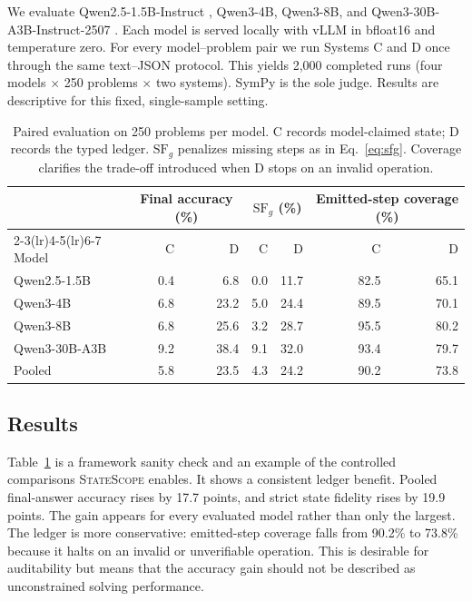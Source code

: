 \documentclass[11pt]{article}
\newcommand{\systemname}{\textsc{StateScope}}
\begin{document}
We evaluate Qwen2.5-1.5B-Instruct \citep{qwen2024qwen25}, Qwen3-4B, Qwen3-8B, and
Qwen3-30B-A3B-Instruct-2507 \citep{yang2025qwen3}.  Each model is served locally
with vLLM in bfloat16 and temperature zero.  For every model--problem pair we run
Systems C and D once through the same text--JSON protocol.  This yields 2,000
completed runs (four models $\times$ 250 problems $\times$ two systems).  SymPy is
the sole judge.  Results are descriptive for this fixed, single-sample setting.

\begin{table}[t]
\centering
\small
\begin{tabular}{lrrrrrr}
\toprule
& \multicolumn{2}{c}{Final accuracy (\%)}
& \multicolumn{2}{c}{$\mathrm{SF}_{g}$ (\%)}
& \multicolumn{2}{c}{Emitted-step coverage (\%)} \\
\cmidrule(lr){2-3}\cmidrule(lr){4-5}\cmidrule(lr){6-7}
Model & C & D & C & D & C & D \\
\midrule
Qwen2.5-1.5B          & 0.4 & 6.8  & 0.0 & 11.7 & 82.5 & 65.1 \\
Qwen3-4B              & 6.8 & 23.2 & 5.0 & 24.4 & 89.5 & 70.1 \\
Qwen3-8B              & 6.8 & 25.6 & 3.2 & 28.7 & 95.5 & 80.2 \\
Qwen3-30B-A3B         & 9.2 & 38.4 & 9.1 & 32.0 & 93.4 & 79.7 \\
\midrule
Pooled                 & 5.8 & 23.5 & 4.3 & 24.2 & 90.2 & 73.8 \\
\bottomrule
\end{tabular}
\caption{Paired evaluation on 250 problems per model.  C records model-claimed
state; D records the typed ledger.  $\mathrm{SF}_{g}$ penalizes missing steps as in
Eq.~\ref{eq:sfg}.  Coverage clarifies the trade-off introduced when D stops on an
invalid operation.}
\label{tab:main}
\end{table}

\subsection{Results}

Table~\ref{tab:main} is a framework sanity check and an example of the controlled
comparisons \systemname{} enables.  It shows a consistent ledger benefit.  Pooled final-answer
accuracy rises by 17.7 points, and strict state fidelity rises by 19.9 points.  The
gain appears for every evaluated model rather than only the largest.  The ledger is
more conservative: emitted-step coverage falls from 90.2\% to 73.8\% because it
halts on an invalid or unverifiable operation.  This is desirable for auditability
but means that the accuracy gain should not be described as unconstrained solving
performance.
\end{document}
